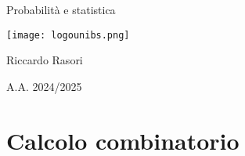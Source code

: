 \documentclass{report}
\begin{document}
\begin{center}
  \vspace*{2cm}
  {\Huge Probabilità e statistica \par}
  \vspace{1cm}
  \texttt{[image: logounibs.png]}\par
  \vspace{1cm}
  {\Large Riccardo Rasori \par}
  \vspace{0.5cm}
  {\large A.A. 2024/2025 \par}
  \vspace{2cm}
\end{center}

\tableofcontents %


\section{Calcolo combinatorio}
\end{document}

